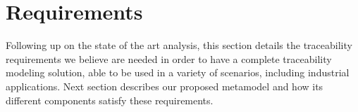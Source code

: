 	\vspace{-0.2truecm}
\section{Requirements}\label{sec:requirements}
	\vspace{-0.2truecm}


Following up on the state of the art analysis, this section details the traceability requirements we believe are needed in order to have a complete traceability modeling solution, able to be used in a variety of scenarios, including industrial applications. Next section describes our proposed metamodel and how its different components satisfy these requirements.



